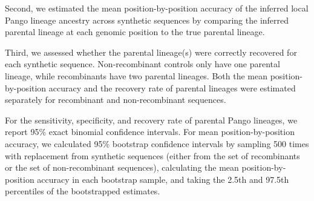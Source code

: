 \documentclass[11pt,oneside,letterpaper]{article}
\begin{document}
Second, we estimated the mean position-by-position accuracy of the inferred local Pango lineage ancestry across synthetic sequences by comparing the inferred parental lineage at each genomic position to the true parental lineage. 

Third, we assessed whether the parental lineage(s) were correctly recovered for each synthetic sequence. Non-recombinant controls only have one parental lineage, while recombinants have two parental lineages. Both the mean position-by-position accuracy and the recovery rate of parental lineages were estimated separately for recombinant and non-recombinant sequences. 

For the sensitivity, specificity, and recovery rate of parental Pango lineages, we report 95\% exact binomial confidence intervals. For mean position-by-position accuracy, we calculated 95\% bootstrap confidence intervals by sampling 500 times with replacement from synthetic sequences (either from the set of recombinants or the set of non-recombinant sequences), calculating the mean position-by-position accuracy in each bootstrap sample, and taking the 2.5th and 97.5th percentiles of the bootstrapped estimates. 






\end{document}

